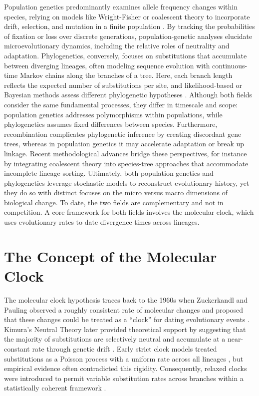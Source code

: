 Population genetics predominantly examines allele frequency changes within species, relying on models like Wright-Fisher or coalescent theory to incorporate drift, selection, and mutation in a finite population \cite{hein2004gene}. By tracking the probabilities of fixation or loss over discrete generations, population-genetic analyses elucidate microevolutionary dynamics, including the relative roles of neutrality and adaptation. Phylogenetics, conversely, focuses on substitutions that accumulate between diverging lineages, often modeling sequence evolution with continuous-time Markov chains along the branches of a tree. Here, each branch length reflects the expected number of substitutions per site, and likelihood-based or Bayesian methods assess different phylogenetic hypotheses \cite{KosiolGoldman2011}. Although both fields consider the same fundamental processes, they differ in timescale and scope: population genetics addresses polymorphisms within populations, while phylogenetics assumes fixed differences between species. Furthermore, recombination complicates phylogenetic inference by creating discordant gene trees, whereas in population genetics it may accelerate adaptation or break up linkage. Recent methodological advances bridge these perspectives, for instance by integrating coalescent theory into species-tree approaches that accommodate incomplete lineage sorting. Ultimately, both population genetics and phylogenetics leverage stochastic models to reconstruct evolutionary history, yet they do so with distinct focuses on the micro versus macro dimensions of biological change. To date, the two fields are complementary and not in competition. A core framework for both fields involves the molecular clock, which uses evolutionary rates to date divergence times across lineages.


\section{The Concept of the Molecular Clock}
The molecular clock hypothesis traces back to the 1960s when Zuckerkandl and Pauling observed a roughly consistent rate of molecular changes and proposed that these changes could be treated as a ``clock'' for dating evolutionary events \cite{zuckerkandl-pauling1965}. Kimura's Neutral Theory later provided theoretical support by suggesting that the majority of substitutions are selectively neutral and accumulate at a near-constant rate through genetic drift \cite{Bromham2003}. Early strict clock models treated substitutions as a Poisson process with a uniform rate across all lineages \cite{takahata2007}, but empirical evidence often contradicted this rigidity. Consequently, relaxed clocks were introduced to permit variable substitution rates across branches within a statistically coherent framework \cite{Drummond2006}. 

